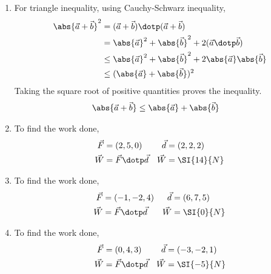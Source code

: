 \begin{enumerate}
      \item For triangle inequality, using Cauchy-Schwarz inequality,
            \begin{align}
                  \abs{\vec{a} + \vec{b}}^2 & = (\vec{a} + \vec{b}) \dotp
                  (\vec{a} + \vec{b})                                                \\
                                            & = \abs{\vec{a}}^2 + \abs{\vec{b}}^2
                  + 2 (\vec{a} \dotp \vec{b})                                        \\
                                            & \leq \abs{\vec{a}}^2 + \abs{\vec{b}}^2
                  + 2 \abs{\vec{a}}\abs{\vec{b}}                                     \\
                                            & \leq (\abs{\vec{a}} + \abs{\vec{b}})^2
            \end{align}
            Taking the square root of positive quantities proves the inequality.
            \begin{align}
                  \abs{\vec{a} + \vec{b}} & \leq \abs{\vec{a}} + \abs{\vec{b}}
            \end{align}

      \item To find the work done,
            \begin{align}
                  \vec{F} & = (2, 5, 0)             & \vec{d} & = (2, 2, 2)  \\
                  \vec{W} & = \vec{F} \dotp \vec{d} & \vec{W} & = \SI{14}{N}
            \end{align}

      \item To find the work done,
            \begin{align}
                  \vec{F} & = (-1, -2, 4)           & \vec{d} & = (6, 7, 5) \\
                  \vec{W} & = \vec{F} \dotp \vec{d} & \vec{W} & = \SI{0}{N}
            \end{align}

      \item To find the work done,
            \begin{align}
                  \vec{F} & = (0, 4, 3)             & \vec{d} & = (-3, -2, 1) \\
                  \vec{W} & = \vec{F} \dotp \vec{d} & \vec{W} & = \SI{-5}{N}
            \end{align}


\end{enumerate}
